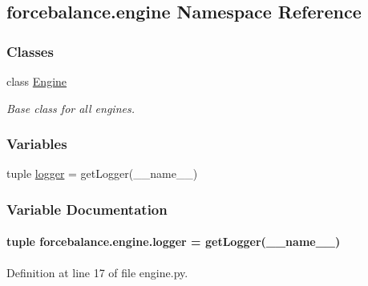 \hypertarget{namespaceforcebalance_1_1engine}{\subsection{forcebalance.\-engine Namespace Reference}
\label{namespaceforcebalance_1_1engine}
}
\subsubsection*{Classes}
\begin{DoxyCompactItemize}
\item 
class \hyperlink{classforcebalance_1_1engine_1_1Engine}{Engine}
\begin{DoxyCompactList}\small\item\em Base class for all engines. \end{DoxyCompactList}\end{DoxyCompactItemize}
\subsubsection*{Variables}
\begin{DoxyCompactItemize}
\item 
tuple \hyperlink{namespaceforcebalance_1_1engine_ae9028cb0bf779c6a559e168e15e7ace1}{logger} = get\-Logger(\-\_\-\-\_\-name\-\_\-\-\_\-)
\end{DoxyCompactItemize}


\subsubsection{Variable Documentation}
\hypertarget{namespaceforcebalance_1_1engine_ae9028cb0bf779c6a559e168e15e7ace1}{
\paragraph[{logger}]{\setlength{\rightskip}{0pt plus 5cm}tuple forcebalance.\-engine.\-logger = get\-Logger(\-\_\-\-\_\-name\-\_\-\-\_\-)}}\label{namespaceforcebalance_1_1engine_ae9028cb0bf779c6a559e168e15e7ace1}


Definition at line 17 of file engine.\-py.

